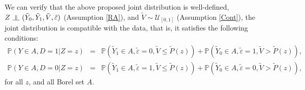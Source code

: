 \documentclass[11pt,reqno]{amsart}
\newcommand{\indep}{\rotatebox[origin=c]{90}{$\models$}}
\theoremstyle{plain}
\numberwithin{equation}{section}
\begin{document}
We can verify that the above proposed joint distribution is well-defined, $Z\ \indep\ (\tilde{Y}_0,\tilde{Y}_1,\tilde{V}, \tilde{\varepsilon})$ (Assumption \ref{RA}), and $\tilde{V} \sim \mathcal U_{[0,1]}$ (Assumption \ref{Cont}), the joint distribution is compatible with the data, that is, it satisfies the following conditions: 
\begin{eqnarray*}
\mathbb P(Y\in A, D=1 \vert Z=z) &=& \mathbb P(\tilde{Y}_1\in A, \tilde{\varepsilon}=0, \tilde{V} \leq \tilde{P}(z)) + \mathbb P(\tilde{Y}_0\in A, \tilde{\varepsilon}=1, \tilde{V} > \tilde{P}(z)),\\
\mathbb P(Y\in A, D=0 \vert Z=z) &=& \mathbb P(\tilde{Y}_1\in A, \tilde{\varepsilon}=1, \tilde{V} \leq \tilde{P}(z)) + \mathbb P(\tilde{Y}_0\in A, \tilde{\varepsilon}=0, \tilde{V} > \tilde{P}(z)),
\end{eqnarray*}
for all $z$, and all Borel set $A$.
\end{document}
